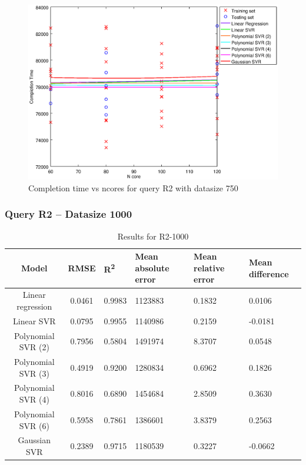 \documentclass[a4paper,11pt]{article}
\begin{document}
\begin {figure}[hbtp]
\centering
\includegraphics[width=\textwidth]{output/R2_750_LINEAR_NCORE/plot_R2_750.eps}
\caption{Completion time vs ncores for query R2 with datasize 750}
\label{fig:all_linear_R2_750}
\end {figure}

\newpage
\subsubsection{Query R2 -- Datasize 1000}
\begin{table}[H]
	\centering
	\begin{adjustbox}{center}
		\begin{tabular}{c | c M{1.2cm} M{2.5cm} M{2.5cm} M{1.8cm}}
			Model & RMSE & R\textsuperscript{2} & Mean absolute error & Mean relative error & Mean difference \tabularnewline
			\hline
			Linear regression & 0.0461 & 0.9983 & 1123883 & 0.1832 & 0.0106 \\
			Linear SVR & 0.0795 & 0.9955 & 1140986 & 0.2159 & -0.0181 \\
			Polynomial SVR (2) & 0.7956 & 0.5804 & 1491974 & 8.3707 & 0.0548 \\
			Polynomial SVR (3) & 0.4919 & 0.9200 & 1280834 & 0.6962 & 0.1826 \\
			Polynomial SVR (4) & 0.8016 & 0.6890 & 1454684 & 2.8509 & 0.3630 \\
			Polynomial SVR (6) & 0.5958 & 0.7861 & 1386601 & 3.8379 & 0.2563 \\
			Gaussian SVR & 0.2389 & 0.9715 & 1180539 & 0.3227 & -0.0662 \\
		\end{tabular}
	\end{adjustbox}
	\\
	\caption{Results for R2-1000}
	\label{fig:all_linear_R2_1000}
\end{table}
\end{document}
